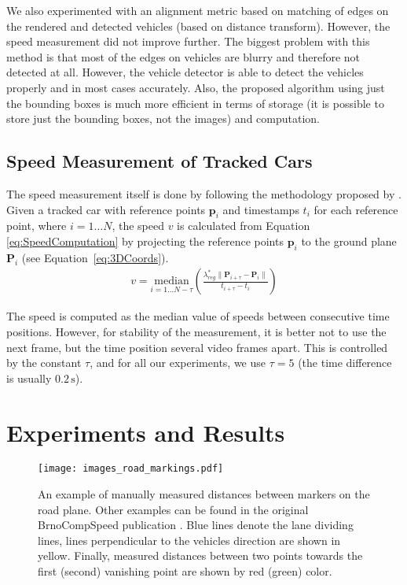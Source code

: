 \documentclass[]{elsarticle}
\begin{document}
We also experimented with an alignment metric based on matching of edges on the rendered and detected vehicles (based on distance transform). However, the speed measurement did not improve further. The biggest problem with this method is that most of the edges on vehicles are blurry and therefore not detected at all. However, the vehicle detector \citep{Girshick2015} is able to detect the vehicles properly and in most cases accurately. Also, the proposed algorithm using just the bounding boxes is much more efficient in terms of storage (it is possible to store just the bounding boxes, not the images) and computation.

\subsection{Speed Measurement of Tracked Cars} \label{sec:SpeedMeasurement}
The speed measurement itself is done by following the methodology proposed by \cite{BrnoCompSpeed}.
Given a tracked car with reference points $\mathbf{p}_i$ and timestamps $t_i$ for each reference point, where $i=1 \dots N$, the speed $v$ is calculated from Equation \eqref{eq:SpeedComputation} by projecting the reference points $\mathbf{p}_i$ to the ground plane $\mathbf{P}_i$ (see Equation~\eqref{eq:3DCoords}).
\begin{eqnarray}
&v = \underset{i=1\dots N-\tau}{\mathrm{median}} \left( \frac{\displaystyle\lambda^*_{reg} \| \mathbf{P}_{i+\tau} - \mathbf{P}_i \|}{\displaystyle t_{i+\tau} - t_i} \right)&\label{eq:SpeedComputation}
\end{eqnarray}

The speed is computed as the median value of speeds between consecutive time positions. However, for stability of the measurement, it is better not to use the next frame, but the time position several video frames apart. This is controlled by the constant $\tau$, and for all our experiments, we use $\tau = 5$ (the time difference is usually $0.2\,\mathrm{s}$).

\section{Experiments and Results} \label{sec:Experiments}
\begin{figure}[t]
	\centering
	\texttt{[image: images\_road\_markings.pdf]}
	\caption{An example of manually measured distances between markers on the road plane. Other examples can be found in the original BrnoCompSpeed publication \citep{BrnoCompSpeed}. Blue lines denote the lane dividing lines, lines perpendicular to the vehicles direction are shown in yellow. Finally, measured distances between two points towards the first (second) vanishing point are shown by red (green) color.} 
	\label{fig:RoadMarkings}
\end{figure}
\end{document}
